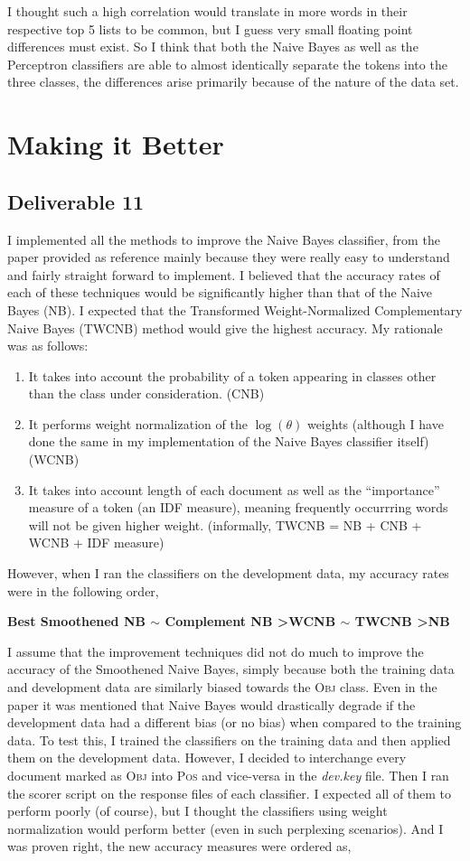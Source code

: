 \documentclass[10pt, letter]{article}
\begin{document}
I thought such a high correlation would translate in more words in their respective top 5 lists to be common, but I guess very small floating point differences must exist. So I think that both the Naive Bayes as well as the Perceptron classifiers are able to almost identically separate the tokens into the three classes, the differences arise primarily because of the nature of the data set.

\section{Making it Better}
\subsection*{Deliverable 11}
I implemented all the methods to improve the Naive Bayes classifier, from the paper provided as reference \cite{rennie2003tackling} mainly because they were really easy to understand and fairly straight forward to implement. I believed that the accuracy rates of each of these techniques would be significantly higher than that of the Naive Bayes (NB). I expected that the Transformed Weight-Normalized Complementary Naive Bayes (TWCNB) method would give the highest accuracy. My rationale was as follows:
\begin{enumerate}
	\item It takes into account the probability of a token appearing in classes other than the class under consideration. (CNB)
	\item It performs weight normalization of the $\log(\theta)$ weights (although I have done the same in my implementation of the Naive Bayes classifier itself) (WCNB)
	\item It takes into account length of each document as well as the ``importance'' measure of a token (an IDF measure), meaning frequently occurrring words will not be given higher weight. (informally, TWCNB = NB + CNB + WCNB + IDF measure)
\end{enumerate}
However, when I ran the classifiers on the development data, my accuracy rates were in the following order,

	\textbf{Best Smoothened NB $\sim$ Complement NB \textgreater WCNB $\sim$ TWCNB \textgreater NB}

I assume that the improvement techniques did not do much to improve the accuracy of the Smoothened Naive Bayes, simply because both the training data and development data are similarly biased towards the \textsc{Obj} class. Even in the paper it was mentioned that Naive Bayes would drastically degrade if the development data had a different bias (or no bias) when compared to the training data. To test this, I trained the classifiers on the training data and then applied them on the development data. However, I decided to interchange every document marked as \textsc{Obj} into \textsc{Pos} and vice-versa in the \textit{dev.key} file. Then I ran the scorer script on the response files of each classifier. I expected all of them to perform poorly (of course), but I thought the classifiers using weight normalization would perform better (even in such perplexing scenarios). And I was proven right, the new accuracy measures were ordered as,
\end{document}
